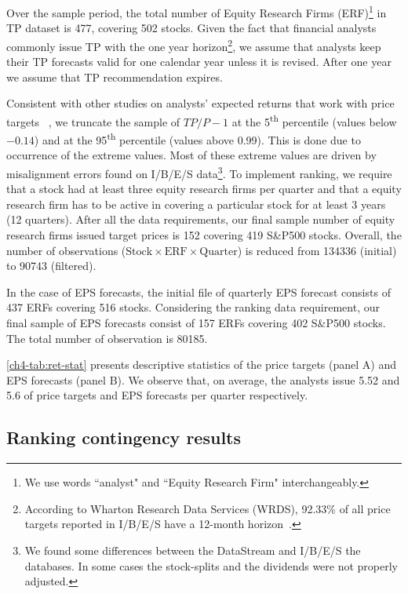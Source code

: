 \documentclass[12pt,a4paper]{article}\usepackage[]{graphicx}\usepackage[]{color}
\begin{document}
Over the sample period, the total number of Equity Research Firms (ERF)\footnote{We use words ``analyst" and ``Equity Research Firm" interchangeably.} in TP dataset is 477, covering 502  stocks. Given the fact that financial analysts commonly issue TP with the one year horizon\footnote{According to Wharton Research Data Services (WRDS), 92.33\% of all price targets reported in I/B/E/S have a 12-month horizon~\citep{glushkov2009}.}, we assume that analysts keep their TP forecasts valid for one calendar year unless it is revised. After one year we assume that TP recommendation expires.

Consistent with other studies on analysts' expected returns that work with price targets ~\citep{bradshaw2002,brav2003,da2011}, we truncate the sample of $TP/P-1$ at the 5\textsuperscript{th} percentile (values below \ensuremath{-0.14}) and at the 95\textsuperscript{th} percentile (values above 0.99). This is done due to occurrence of the extreme values. Most of these extreme values are driven by misalignment errors found on I/B/E/S data\footnote{We found some differences between the  DataStream and I/B/E/S the databases. In some cases the stock-splits and the dividends were not properly adjusted.}. To implement ranking, we require that a stock had at least three equity research firms per quarter and that a equity research firm has to be active in covering a particular stock for at least 3 years (12 quarters). After all the  data requirements, our final sample number of equity research firms issued target prices is 152 covering 419 S\&P500 stocks. Overall, the number of observations ($\mathrm{Stock} \times \mathrm{ERF} \times  \mathrm{Quarter}$) is reduced  from 134336 (initial) to 90743 (filtered).

In the case of EPS forecasts, the initial file of quarterly EPS forecast consists of 437 ERFs covering 516 stocks. Considering the ranking data requirement, our final sample of EPS forecasts consist of  157 ERFs covering 402 S\&P500 stocks. The total number of observation is 80185.

\ref{ch4-tab:ret-stat} presents descriptive statistics of the price targets (panel A) and EPS forecasts (panel B). We observe that, on average, the analysts issue 5.52 and 5.6 of price targets and EPS forecasts per quarter respectively. 

\subsection{Ranking contingency results}
\label{ch4-tab:rank-contin}
\end{document}
